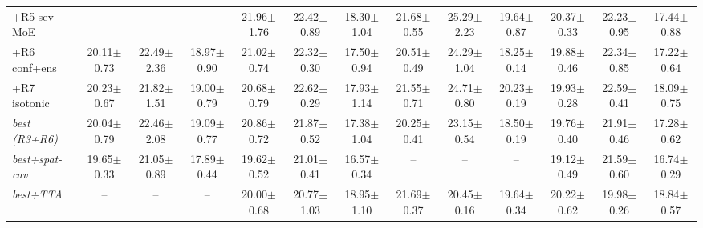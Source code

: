 \begin{table}[t]
{\begin{tabular}{l  c c c  c c c  c c c  c c c }
+R5 sev-MoE & -- & -- & -- & 21.96\scriptsize$\pm$1.76 & 22.42\scriptsize$\pm$0.89 & 18.30\scriptsize$\pm$1.04 & 21.68\scriptsize$\pm$0.55 & 25.29\scriptsize$\pm$2.23 & 19.64\scriptsize$\pm$0.87 & 20.37\scriptsize$\pm$0.33 & 22.23\scriptsize$\pm$0.95 & 17.44\scriptsize$\pm$0.88 \\
+R6 conf+ens & 20.11\scriptsize$\pm$0.73 & 22.49\scriptsize$\pm$2.36 & 18.97\scriptsize$\pm$0.90 & 21.02\scriptsize$\pm$0.74 & 22.32\scriptsize$\pm$0.30 & 17.50\scriptsize$\pm$0.94 & 20.51\scriptsize$\pm$0.49 & 24.29\scriptsize$\pm$1.04 & 18.25\scriptsize$\pm$0.14 & 19.88\scriptsize$\pm$0.46 & 22.34\scriptsize$\pm$0.85 & 17.22\scriptsize$\pm$0.64 \\
+R7 isotonic & 20.23\scriptsize$\pm$0.67 & 21.82\scriptsize$\pm$1.51 & 19.00\scriptsize$\pm$0.79 & 20.68\scriptsize$\pm$0.79 & 22.62\scriptsize$\pm$0.29 & 17.93\scriptsize$\pm$1.14 & 21.55\scriptsize$\pm$0.71 & 24.71\scriptsize$\pm$0.80 & 20.23\scriptsize$\pm$0.19 & 19.93\scriptsize$\pm$0.28 & 22.59\scriptsize$\pm$0.41 & 18.09\scriptsize$\pm$0.75 \\
\textit{best (R3+R6)} & 20.04\scriptsize$\pm$0.79 & 22.46\scriptsize$\pm$2.08 & 19.09\scriptsize$\pm$0.77 & 20.86\scriptsize$\pm$0.72 & 21.87\scriptsize$\pm$0.52 & 17.38\scriptsize$\pm$1.04 & 20.25\scriptsize$\pm$0.41 & 23.15\scriptsize$\pm$0.54 & 18.50\scriptsize$\pm$0.19 & 19.76\scriptsize$\pm$0.40 & 21.91\scriptsize$\pm$0.46 & 17.28\scriptsize$\pm$0.62 \\
\textit{best+spat-cav} & 19.65\scriptsize$\pm$0.33 & 21.05\scriptsize$\pm$0.89 & 17.89\scriptsize$\pm$0.44 & 19.62\scriptsize$\pm$0.52 & 21.01\scriptsize$\pm$0.41 & 16.57\scriptsize$\pm$0.34 & -- & -- & -- & 19.12\scriptsize$\pm$0.49 & 21.59\scriptsize$\pm$0.60 & 16.74\scriptsize$\pm$0.29 \\
\textit{best+TTA} & -- & -- & -- & 20.00\scriptsize$\pm$0.68 & 20.77\scriptsize$\pm$1.03 & 18.95\scriptsize$\pm$1.10 & 21.69\scriptsize$\pm$0.37 & 20.45\scriptsize$\pm$0.16 & 19.64\scriptsize$\pm$0.34 & 20.22\scriptsize$\pm$0.62 & 19.98\scriptsize$\pm$0.26 & 18.84\scriptsize$\pm$0.57 \\
\bottomrule
\end{tabular}%
}
\end{table}